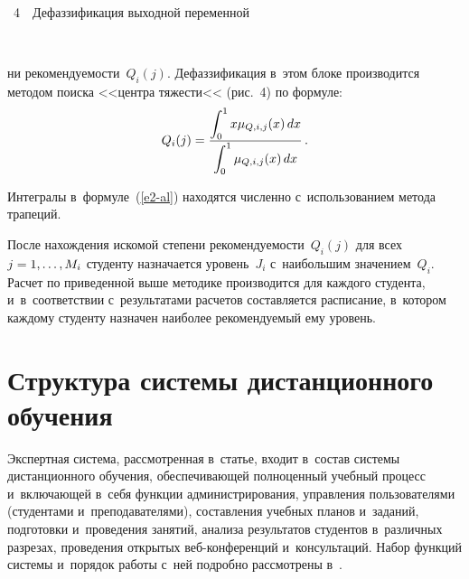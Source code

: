 \begin{multicols}{2}
{ \begin{center}  %
 \vspace*{14pt}
 \mbox{%
\epsfxsize=77.087mm
}


\vspace*{7pt}


\noindent
{{\figurename~4}\ \ \small{Дефаззификация выходной переменной}}
\end{center}
}


\addtocounter{figure}{1}

 \begin{figure*}[b] %
   \vspace*{12pt}
\begin{center}
\mbox{%
\epsfxsize=159.725mm
}
\end{center}
\vspace*{-9pt}
  \end{figure*}
  

\pagebreak

\noindent
ни  рекомендуемости~$Q_i(j)$. Дефаззификация в~этом блоке производится 
методом поиска <<центра тя\-жести<< (рис.~4) по формуле:
  \begin{equation}
  Q_i(j)= \displaystyle\frac{\displaystyle \int\nolimits_0^1 x\mu_{Q,i,j}(x)\,dx\mathstrut}{\displaystyle \int\nolimits_0^1 
\mu_{Q,i,j}(x)\,dx\mathstrut}\,.
  \label{e2-al}
  \end{equation}
    
  Интегралы в~формуле~(\ref{e2-al}) находятся численно с~использованием 
метода трапеций.
  
  
  
  После нахождения искомой степени рекомендуемости~$Q_i(j)$ для всех 
$j\hm=1,\ldots, M_i$ студенту назначается уровень~$J_i$ с~наибольшим 
значением~$Q_i$. Расчет по приведенной выше методике производится для 
каждого студента, и~в~соответствии с~результатами расчетов составляется 
расписание, в~котором каждому студенту назначен наиболее ре\-ко\-мен\-ду\-емый 
ему уровень.

\vspace*{-6pt}
  
\section{Структура системы дистанционного обучения}
  
  Экспертная система, рассмотренная в~статье, входит в~состав системы 
дистанционного обучения, обеспечивающей полноценный учебный процесс 
и~включающей в~себя функции администрирования, управления 
пользователями (студентами и~преподавателями), составления учебных планов и~заданий, подготовки и~проведения занятий, анализа результатов студентов 
в~различных разрезах, проведения открытых веб-конференций и~консультаций. 
Набор функций системы и~порядок работы с~ней подробно рассмотрены 
в~\cite{8-al}. 
  

\end{multicols}
